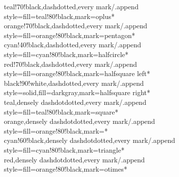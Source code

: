 \documentclass[a4paper]{article}
\begin{document}
{%
	teal!70!black,dashdotted,every mark/.append style={fill=teal!80!black},mark=oplus*\\
	orange!70!black,dashdotted,every mark/.append style={fill=orange!80!black},mark=pentagon*\\
	cyan!40!black,dashdotted,every mark/.append style={fill=cyan!80!black},mark=halfcircle*\\
	red!70!black,dashdotted,every mark/.append style={fill=orange!80!black},mark=halfsquare left*\\
	black!90!white,dashdotted,every mark/.append style={solid,fill=darkgray},mark=halfsquare right*\\
	teal,densely dashdotdotted,every mark/.append style={fill=teal!80!black},mark=square*\\
	orange,densely dashdotdotted,every mark/.append style={fill=orange!80!black},mark=*\\
	cyan!60!black,densely dashdotdotted,every mark/.append style={fill=cyan!80!black},mark=triangle*\\
	red,densely dashdotdotted,every mark/.append style={fill=orange!80!black},mark=otimes*\\
}
\end{document}

